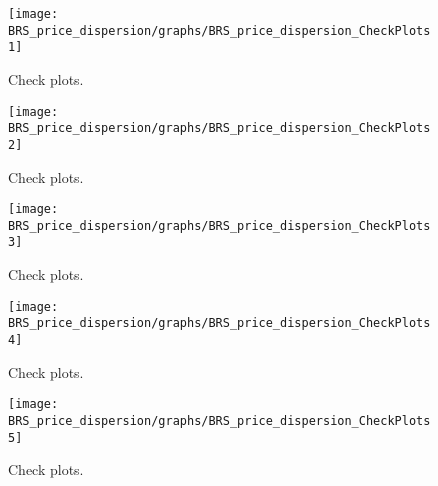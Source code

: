  
\begin{figure}[H]
\centering 
\texttt{[image: BRS\_price\_dispersion/graphs/BRS\_price\_dispersion\_CheckPlots1]}
\caption{Check plots.}\label{Fig:CheckPlots:1}
\end{figure}
 
\begin{figure}[H]
\centering 
\texttt{[image: BRS\_price\_dispersion/graphs/BRS\_price\_dispersion\_CheckPlots2]}
\caption{Check plots.}\label{Fig:CheckPlots:2}
\end{figure}
 
\begin{figure}[H]
\centering 
\texttt{[image: BRS\_price\_dispersion/graphs/BRS\_price\_dispersion\_CheckPlots3]}
\caption{Check plots.}\label{Fig:CheckPlots:3}
\end{figure}
 
\begin{figure}[H]
\centering 
\texttt{[image: BRS\_price\_dispersion/graphs/BRS\_price\_dispersion\_CheckPlots4]}
\caption{Check plots.}\label{Fig:CheckPlots:4}
\end{figure}
 
\begin{figure}[H]
\centering 
\texttt{[image: BRS\_price\_dispersion/graphs/BRS\_price\_dispersion\_CheckPlots5]}
\caption{Check plots.}\label{Fig:CheckPlots:5}
\end{figure}
 
